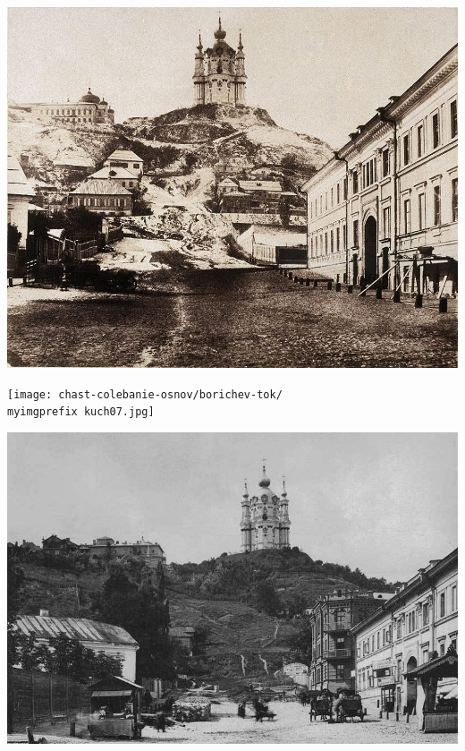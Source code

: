\begin{center}
\includegraphics[width=\linewidth]{chast-colebanie-osnov/borichev-tok/kuch04-02.jpg}
\end{center}

\begin{center}
\texttt{[image: chast-colebanie-osnov/borichev-tok/\\myimgprefix kuch07.jpg]}
\end{center}
\vspace*{\fill}

\newpage

\begin{center}
\includegraphics[width=\linewidth]{chast-colebanie-osnov/borichev-tok/kuch02.jpg}
\end{center}

